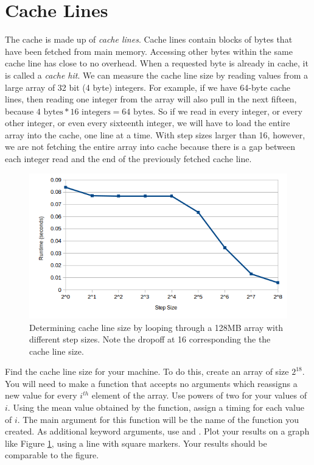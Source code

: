 \section*{Cache Lines}
The cache is made up of \emph{cache lines}.
Cache lines contain blocks of bytes that have been fetched from main memory.
Accessing other bytes within the same cache line has close to no overhead.
When a requested byte is already in cache, it is called a \emph{cache hit}.
We can measure the cache line size by reading values from a large array of 32 bit (4 byte) integers.
For example, if we have 64-byte cache lines, then reading one integer from the array will also pull in the next fifteen, because $4 \mbox{~bytes} * 16 \mbox{~integers} = 64 \mbox{~bytes}$.
So if we read in every integer, or every other integer, or even every sixteenth integer, we will have to load the entire array into the cache, one line at a time.
With step sizes larger than 16, however, we are not fetching the entire array into cache because there is a gap between each integer read and the end of the previously fetched cache line.
\begin{figure}[h]
\centering
\includegraphics[width=\textwidth]{cache_line.png}
\caption{Determining cache line size by looping through a 128MB array with different step sizes. Note the dropoff at 16 corresponding the the cache line size.}
\label{fig:linesize}
\end{figure}

\begin{problem}

Find the cache line size for your machine.  To do this, create an array of size $2^{18}$. You will need to make a function that accepts no arguments which reassigns a new value for every $i^{th}$ element of the array.   Use powers of two for your values of $i$.  Using the mean value obtained by the  function, assign a timing for each value of $i$.  The main argument for this function will be the name of the function you created.  As additional keyword arguments, use  and .  Plot your results on a graph like Figure \ref{fig:linesize}, using a line with square markers.  Your results should be comparable to the figure.

\label{prob:cacheline}
\end{problem}

